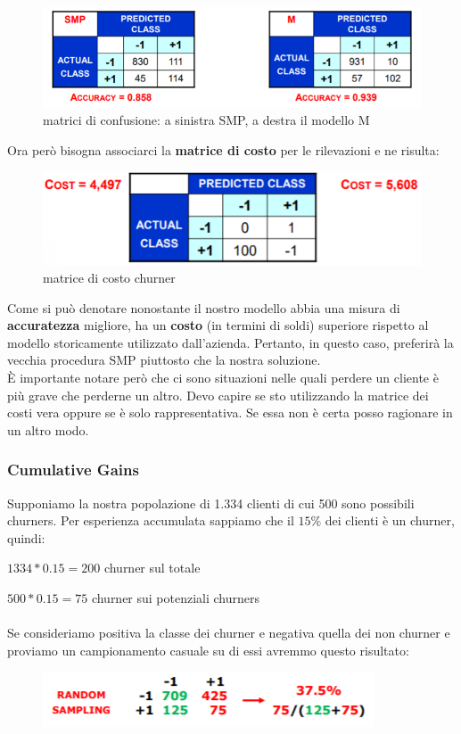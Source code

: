 \begin{figure}[H]
	\hspace{-0.3cm}
	\includegraphics[height=0.3 \linewidth]{classification/pict/esConfMatr.png}
	\caption{matrici di confusione: a sinistra SMP, a destra il modello M}
\end{figure}
Ora però bisogna associarci la \textbf{matrice di costo} per le rilevazioni e ne risulta:
\begin{figure}[H]
	\centering
	\includegraphics[height=0.2 \linewidth]{classification/pict/esMatrCosto.png}
	\caption{matrice di costo churner}
\end{figure}
Come si può denotare nonostante il nostro modello abbia una misura di \textbf{accuratezza} migliore, ha un \textbf{costo} (in termini di soldi) superiore rispetto al modello storicamente utilizzato dall'azienda. Pertanto, in questo caso, preferirà la vecchia procedura SMP piuttosto che la nostra soluzione.\\

\`E importante notare per\`o che ci sono situazioni nelle quali perdere un cliente \`e pi\`u grave che perderne un altro. Devo capire se sto utilizzando la matrice dei costi vera oppure se \`e solo rappresentativa. Se essa non \`e certa posso ragionare in un altro modo.
\subsubsection{Cumulative Gains} 
Supponiamo la nostra popolazione di 1.334 clienti di cui 500 sono possibili churners. Per esperienza accumulata sappiamo che il $15\%$ dei clienti è un churner, quindi:

$1334*0.15 = 200$ churner sul totale

$500*0.15 = 75$ churner sui potenziali churners
\\\\
Se consideriamo positiva la classe dei churner e negativa quella dei non churner e proviamo un campionamento casuale su di essi avremmo questo risultato:
\begin{figure}[H]
	\centering
	\includegraphics[height=0.1 \linewidth]{classification/pict/esChurnerRandom.png}
\end{figure}

